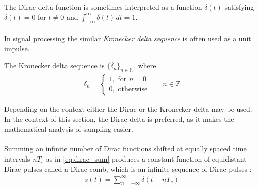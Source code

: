 The Dirac delta function is sometimes interpreted as a function $\delta(t)$ satisfying $\delta(t)=0$ for $t\neq 0$ and $\int_{-\infty}^{\infty}\!\delta(t)\,dt=1$.
\\ \\
In signal processing the similar \textit{Kronecker delta sequence} is often used as a unit impulse.
\begin{definition}\label{def:kronecker}
The Kronecker delta sequence is $\{\delta_n\}_{n\in\mathbb{N}}$, where
\begin{align}
\delta_n=
\begin{cases}1,\text{ for }n=0\\
0,\text{ otherwise}
\end{cases}\phantom{mm}n\in\mathbb{Z}
\end{align}
\end{definition}

Depending on the context either the Dirac or the Kronecker delta may be used. In the context of this section, the Dirac delta is preferred, as it makes the mathematical analysis of sampling easier.\\\\
Summing an infinite number of Dirac functions shifted at equally spaced time intervals $nT_s$ as in \eqref{eq:dirac_sum} produces a constant function of equidistant Dirac pulses called a Dirac comb, which is an infinite sequence of Dirac pulses \cite{page 164, DTSP}:
\begin{align} \label{eq:dirac_sum}
s(t)=\sum_{n=-\infty}^{\infty}\delta(t-nT_s)
\end{align}

